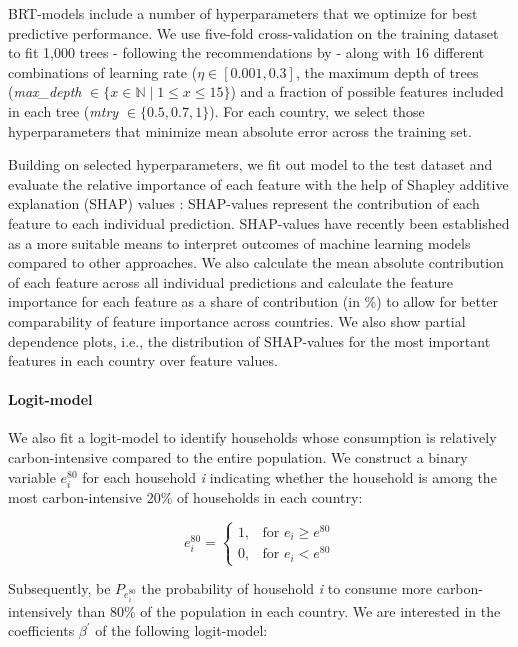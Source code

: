 \documentclass[12pt, a4paper]{article}
\begin{document}
BRT-models include a number of hyperparameters that we optimize for best predictive performance. We use five-fold cross-validation on the training dataset to fit 1,000 trees - following the recommendations by \autocite{Elith.2008} -  along with 16 different combinations of learning rate ($\eta \in [0.001,0.3]$, the maximum depth of trees (\textit{max\_depth} $\in \{x \in \mathbb{N} \mid 1  \leq x \leq 15 \}$) and a fraction of possible features included in each tree (\textit{mtry} $\in \{0.5,0.7,1\}$). For each country, we select those hyperparameters that minimize mean absolute error across the training set.

Building on selected hyperparameters, we fit out model to the test dataset and evaluate the relative importance of each feature with the help of Shapley additive explanation (SHAP) values \autocite{Lundberg.2020}: SHAP-values represent the contribution of each feature to each individual prediction. SHAP-values have recently been established as a more suitable means to interpret outcomes of machine learning models compared to other approaches. We also calculate the mean absolute contribution of each feature across all individual predictions and calculate the feature importance for each feature as a share of contribution (in \%) to allow for better comparability of feature importance across countries. We also show partial dependence plots, i.e., the distribution of SHAP-values for the most important features in each country over feature values.

\paragraph{Logit-model} We also fit a logit-model to identify households whose consumption is relatively carbon-intensive compared to the entire population. We construct a binary variable $e_{i}^{80}$ for each household \textit{i} indicating whether the household is among the most carbon-intensive 20\% of households in each country:

\begin{equation}
    e_{i}^{80} =
    \begin{cases}
    1, & \text{for }  e_{i} \geq e^{80} \\
    0, & \text{for }  e_{i} < e^{80}
    \end{cases}
\end{equation}

Subsequently, be $P_{e_{i}^{80}}$ the probability of household \textit{i} to consume more carbon-intensively than 80\% of the population in each country. We are interested in the coefficients $\beta^{'}$ of the following logit-model:
\end{document}
